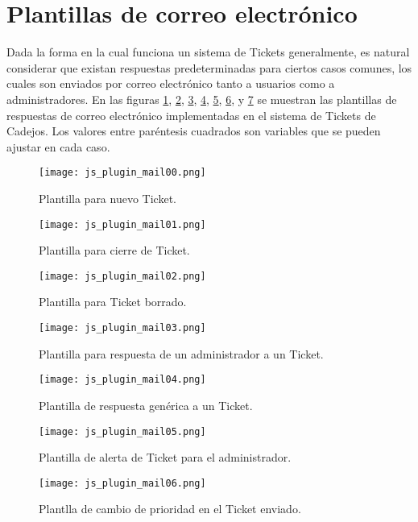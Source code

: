 \section{Plantillas de correo electrónico}
Dada la forma en la cual funciona  un sistema de Tickets generalmente, es natural considerar que existan respuestas predeterminadas para ciertos casos comunes, los cuales son enviados por correo electrónico tanto a usuarios como a administradores. En las figuras \ref{fig:js:11}, \ref{fig:js:12}, \ref{fig:js:13}, \ref{fig:js:14}, \ref{fig:js:15}, \ref{fig:js:16}, y \ref{fig:js:17} se muestran las plantillas de respuestas de correo electrónico implementadas en el sistema de Tickets de Cadejos. Los valores entre paréntesis cuadrados son variables que se pueden ajustar en cada caso.
\begin{figure}[H]
\centering
\texttt{[image: js\_plugin\_mail00.png]}
\caption{Plantilla para nuevo Ticket.}
\label{fig:js:11}
\end{figure}
\begin{figure}[H]
\centering
\texttt{[image: js\_plugin\_mail01.png]}
\caption{Plantilla para cierre de Ticket.}
\label{fig:js:12}
\end{figure}
\begin{figure}[H]
\centering
\texttt{[image: js\_plugin\_mail02.png]}
\caption{Plantilla para Ticket borrado.}
\label{fig:js:13}
\end{figure}
\begin{figure}[H]
\centering
\texttt{[image: js\_plugin\_mail03.png]}
\caption{Plantilla para respuesta de un administrador a un Ticket.}
\label{fig:js:14}
\end{figure}
\begin{figure}[H]
\centering
\texttt{[image: js\_plugin\_mail04.png]}
\caption{Plantilla de respuesta  genérica a un Ticket.}
\label{fig:js:15}
\end{figure}
\begin{figure}[H]
\centering
\texttt{[image: js\_plugin\_mail05.png]}
\caption{Plantilla de alerta de Ticket para el administrador.}
\label{fig:js:16}
\end{figure}
\begin{figure}[H]
\centering
\texttt{[image: js\_plugin\_mail06.png]}
\caption{Plantlla de cambio de prioridad en el Ticket enviado.}
\label{fig:js:17}
\end{figure}
